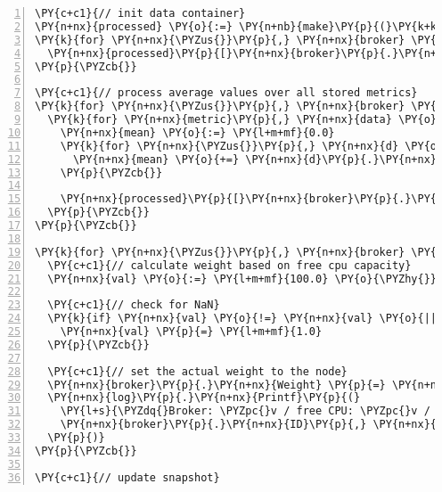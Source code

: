 \begin{Verbatim}[commandchars=\\\{\},numbers=left,firstnumber=1,stepnumber=1,frame=single]
\PY{c+c1}{// init data container}
\PY{n+nx}{processed} \PY{o}{:=} \PY{n+nb}{make}\PY{p}{(}\PY{k+kd}{map}\PY{p}{[}\PY{k+kt}{string}\PY{p}{]}\PY{k+kd}{map}\PY{p}{[}\PY{k+kt}{string}\PY{p}{]}\PY{k+kt}{float64}\PY{p}{)}
\PY{k}{for} \PY{n+nx}{\PYZus{}}\PY{p}{,} \PY{n+nx}{broker} \PY{o}{:=} \PY{k}{range} \PY{n+nx}{endpoints} \PY{p}{\PYZob{}}
  \PY{n+nx}{processed}\PY{p}{[}\PY{n+nx}{broker}\PY{p}{.}\PY{n+nx}{ID}\PY{p}{]} \PY{p}{=} \PY{n+nb}{make}\PY{p}{(}\PY{k+kd}{map}\PY{p}{[}\PY{k+kt}{string}\PY{p}{]}\PY{k+kt}{float64}\PY{p}{)}
\PY{p}{\PYZcb{}}

\PY{c+c1}{// process average values over all stored metrics}
\PY{k}{for} \PY{n+nx}{\PYZus{}}\PY{p}{,} \PY{n+nx}{broker} \PY{o}{:=} \PY{k}{range} \PY{n+nx}{endpoints} \PY{p}{\PYZob{}}
  \PY{k}{for} \PY{n+nx}{metric}\PY{p}{,} \PY{n+nx}{data} \PY{o}{:=} \PY{k}{range} \PY{n+nx}{broker}\PY{p}{.}\PY{n+nx}{Metrics} \PY{p}{\PYZob{}}
    \PY{n+nx}{mean} \PY{o}{:=} \PY{l+m+mf}{0.0}
    \PY{k}{for} \PY{n+nx}{\PYZus{}}\PY{p}{,} \PY{n+nx}{d} \PY{o}{:=} \PY{k}{range} \PY{n+nx}{data} \PY{p}{\PYZob{}}
      \PY{n+nx}{mean} \PY{o}{+=} \PY{n+nx}{d}\PY{p}{.}\PY{n+nx}{Value}
    \PY{p}{\PYZcb{}}

    \PY{n+nx}{processed}\PY{p}{[}\PY{n+nx}{broker}\PY{p}{.}\PY{n+nx}{ID}\PY{p}{]}\PY{p}{[}\PY{n+nx}{metric}\PY{p}{]} \PY{p}{=} \PY{n+nx}{mean} \PY{o}{/} \PY{n+nb}{float64}\PY{p}{(}\PY{n+nb}{len}\PY{p}{(}\PY{n+nx}{data}\PY{p}{)}\PY{p}{)}
  \PY{p}{\PYZcb{}}
\PY{p}{\PYZcb{}}

\PY{k}{for} \PY{n+nx}{\PYZus{}}\PY{p}{,} \PY{n+nx}{broker} \PY{o}{:=} \PY{k}{range} \PY{n+nx}{endpoints} \PY{p}{\PYZob{}}
  \PY{c+c1}{// calculate weight based on free cpu capacity}
  \PY{n+nx}{val} \PY{o}{:=} \PY{l+m+mf}{100.0} \PY{o}{\PYZhy{}} \PY{n+nx}{processed}\PY{p}{[}\PY{n+nx}{broker}\PY{p}{.}\PY{n+nx}{ID}\PY{p}{]}\PY{p}{[}\PY{n+nx}{Metrics}\PY{p}{.}\PY{n+nx}{CpuLoad}\PY{p}{]}

  \PY{c+c1}{// check for NaN}
  \PY{k}{if} \PY{n+nx}{val} \PY{o}{!=} \PY{n+nx}{val} \PY{o}{||} \PY{n+nx}{val} \PY{p}{\PYZlt{}} \PY{l+m+mf}{1.0} \PY{p}{\PYZob{}}
    \PY{n+nx}{val} \PY{p}{=} \PY{l+m+mf}{1.0}
  \PY{p}{\PYZcb{}}

  \PY{c+c1}{// set the actual weight to the node}
  \PY{n+nx}{broker}\PY{p}{.}\PY{n+nx}{Weight} \PY{p}{=} \PY{n+nb}{uint32}\PY{p}{(}\PY{n+nx}{math}\PY{p}{.}\PY{n+nx}{Round}\PY{p}{(}\PY{n+nx}{val}\PY{p}{)}\PY{p}{)}
  \PY{n+nx}{log}\PY{p}{.}\PY{n+nx}{Printf}\PY{p}{(}
    \PY{l+s}{\PYZdq{}Broker: \PYZpc{}v / free CPU: \PYZpc{}v / Weight: \PYZpc{}v / Healthy: \PYZpc{}v\PYZdq{}}\PY{p}{,}
    \PY{n+nx}{broker}\PY{p}{.}\PY{n+nx}{ID}\PY{p}{,} \PY{n+nx}{val}\PY{p}{,} \PY{n+nx}{broker}\PY{p}{.}\PY{n+nx}{Weight}\PY{p}{,} \PY{n+nx}{broker}\PY{p}{.}\PY{n+nx}{Healthy}\PY{p}{,}
  \PY{p}{)}
\PY{p}{\PYZcb{}}

\PY{c+c1}{// update snapshot}
\end{Verbatim}
